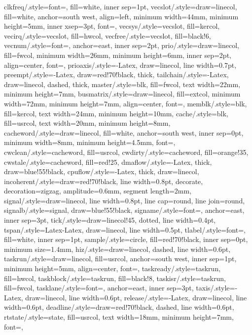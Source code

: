{  clkfreq/.style={font=\sffamily\tiny, fill=white, inner sep=1pt},
  vecslot/.style={draw=linecol, fill=white, anchor=south west, align=left,
                  minimum width=44mm, minimum height=5mm, inner xsep=3pt,
                  font=\sffamily\scriptsize},
  vecsys/.style={vecslot, fill=kercol},
  vecirq/.style={vecslot, fill=hwcol},
  vecfree/.style={vecslot, fill=black!6},
  vecnum/.style={font=\tiny\ttfamily, anchor=east, inner sep=2pt},
  prio/.style={draw=linecol, fill=fwcol, minimum width=26mm, minimum height=6mm,
               inner sep=2pt, align=center, font=\sffamily\scriptsize},
  prioaxis/.style={-Latex, draw=linecol, line width=0.7pt},
  preempt/.style={-Latex, draw=red!70!black, thick},
  tailchain/.style={-Latex, draw=linecol, dashed, thick},
  master/.style={blk, fill=fwcol, text width=22mm, minimum height=7mm},
  busmatrix/.style={draw=linecol, fill=extcol, minimum width=72mm, minimum height=7mm,
                    align=center, font=\sffamily\small},
  memblk/.style={blk, fill=kercol, text width=24mm, minimum height=10mm},
  cache/.style={blk, fill=usrcol, text width=20mm, minimum height=8mm},
  cacheword/.style={draw=linecol, fill=white, anchor=south west, inner sep=0pt,
                    minimum width=8mm, minimum height=4.5mm, font=\sffamily\tiny},
  cwclean/.style={cacheword, fill=usrcol},
  cwdirty/.style={cacheword, fill=orange!35},
  cwstale/.style={cacheword, fill=red!25},
  dmaflow/.style={-Latex, thick, draw=blue!55!black},
  cpuflow/.style={-Latex, thick, draw=linecol},
  incoherent/.style={draw=red!70!black, line width=0.8pt, decorate,
                     decoration={zigzag, amplitude=0.6mm, segment length=2mm}},
  signal/.style={draw=linecol, line width=0.8pt, line cap=round, line join=round},
  signalb/.style={signal, draw=blue!55!black},
  signame/.style={font=\sffamily\scriptsize, anchor=east, inner sep=3pt},
  tick/.style={draw=linecol!45, dotted, line width=0.4pt},
  tspan/.style={Latex-Latex, draw=linecol, line width=0.5pt},
  tlabel/.style={font=\sffamily\tiny, fill=white, inner sep=1pt},
  sample/.style={circle, fill=red!70!black, inner sep=0pt, minimum size=1.4mm},
  hiz/.style={draw=linecol, dashed, line width=0.6pt},
  taskrun/.style={draw=linecol, fill=usrcol, anchor=south west, inner sep=1pt,
                  minimum height=5mm, align=center, font=\sffamily\tiny},
  taskready/.style={taskrun, fill=hwcol},
  taskblock/.style={taskrun, fill=black!8},
  taskisr/.style={taskrun, fill=fwcol},
  tasklane/.style={font=\sffamily\scriptsize, anchor=east, inner sep=3pt},
  taxis/.style={-Latex, draw=linecol, line width=0.6pt},
  release/.style={-Latex, draw=linecol, line width=0.6pt},
  deadline/.style={draw=red!70!black, dashed, line width=0.6pt},
  rtstate/.style={state, fill=usrcol, text width=18mm, minimum height=7mm,
                  font=\sffamily\scriptsize},
}

